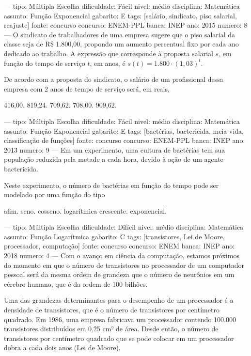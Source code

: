 ---
tipo: Múltipla Escolha
dificuldade: Fácil
nivel: médio
disciplina: Matemática
assunto: Função Exponencial
gabarito: E
tags: [salário, sindicato, piso salarial, reajuste]
fonte: concurso
concurso: ENEM-PPL
banca: INEP
ano: 2015
numero: 8
---
\question
O sindicato de trabalhadores de uma empresa sugere que o piso salarial da classe seja de R\$ 1{.}800,00, propondo um aumento percentual fixo por cada ano dedicado ao trabalho. A expressão que corresponde à proposta salarial \( s \), em função do tempo de serviço \( t \), em anos, é \( s(t) = 1{.}800 \cdot (1{,}03)^t \).

De acordo com a proposta do sindicato, o salário de um profissional dessa empresa com 2 anos de tempo de serviço será, em reais,
\begin{oneparchoices}
416,00.
819,24.
709,62.
708,00.
909,62.
\end{oneparchoices}

---
tipo: Múltipla Escolha
dificuldade: Fácil
nivel: médio
disciplina: Matemática
assunto: Função Exponencial
gabarito: E
tags: [bactérias, bactericida, meia-vida, classificação de funções]
fonte: concurso
concurso: ENEM-PPL
banca: INEP
ano: 2013
numero: 9
---
\question
Em um experimento, uma cultura de bactérias tem sua população reduzida pela metade a cada hora, devido à ação de um agente bactericida.

Neste experimento, o número de bactérias em função do tempo pode ser modelado por uma função do tipo
\begin{choices}
\choice afim.
\choice seno.
\choice cosseno.
\choice logarítmica crescente.
\correctchoice exponencial.
\end{choices}

---
tipo: Múltipla Escolha
dificuldade: Difícil
nivel: médio
disciplina: Matemática
assunto: Função Logarítmica
gabarito: C
tags: [transistores, Lei de Moore, processador, computação]
fonte: concurso
concurso: ENEM
banca: INEP
ano: 2018
numero: 4
---
\question
Com o avanço em ciência da computação, estamos próximos do momento em que o número de transistores no processador de um computador pessoal será da mesma ordem de grandeza que o número de neurônios em um cérebro humano, que é da ordem de 100 bilhões.

Uma das grandezas determinantes para o desempenho de um processador é a densidade de transistores, que é o número de transistores por centímetro quadrado. Em 1986, uma empresa fabricava um processador contendo 100{.}000 transistores distribuídos em 0,25 cm² de área. Desde então, o número de transistores por centímetro quadrado que se pode colocar em um processador dobra a cada dois anos (Lei de Moore).

